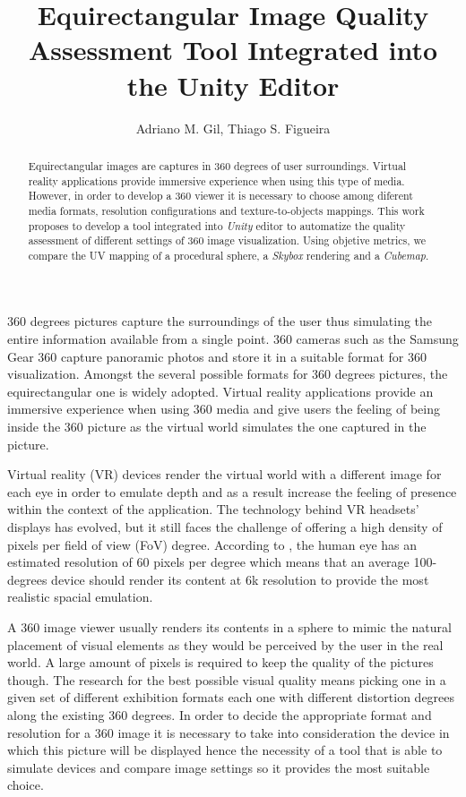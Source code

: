 \documentclass[12pt]{article}
\title{Equirectangular Image Quality Assessment Tool Integrated into the Unity Editor}
\author{Adriano M. Gil\inst{1}, Thiago S. Figueira\inst{1}}
\begin{document}
\maketitle

\begin{abstract}
    Equirectangular images are captures in 360 degrees of user surroundings. Virtual reality applications provide immersive experience when using this type of media. However, in order to develop a 360 viewer it is necessary to choose among diferent media formats, resolution configurations and texture-to-objects mappings. This work proposes to develop a tool integrated into \textit{Unity} editor to automatize the quality assessment of different settings of 360 image visualization. Using objetive metrics, we compare the UV mapping of a procedural sphere, a \textit{Skybox} rendering and a \textit{Cubemap}.
\end{abstract}

360 degrees pictures capture the surroundings of the user thus simulating the entire information available from a single point. 360 cameras such as the Samsung Gear 360 capture panoramic photos and store it in a suitable format for 360 visualization. Amongst the several possible formats for 360 degrees pictures, the equirectangular one is widely adopted. Virtual reality applications provide an immersive experience when using 360 media and give users the feeling of being inside the 360 picture as the virtual world simulates the one captured in the picture.

Virtual reality (VR) devices render the virtual world with a different image for each eye in order to emulate depth and as a result increase the feeling of presence within the context of the application. The technology behind VR headsets' displays has evolved, but it still faces the challenge of offering a high density of pixels per field of view (FoV) degree. According to \cite{va1965visual}, the human eye has an estimated resolution of 60 pixels per degree which means that an average 100-degrees device should render its content at 6k resolution to provide the most realistic spacial emulation.

A 360 image viewer usually renders its contents in a sphere to mimic the natural placement of visual elements as they would be perceived by the user in the real world. A large amount of pixels is required to keep the quality of the pictures though. The research for the best possible visual quality means picking one in a given set of different exhibition formats each one with different distortion degrees along the existing 360 degrees. In order to decide the appropriate format and resolution for a 360 image it is necessary to take into consideration the device in which this picture will be displayed hence the necessity of a tool that is able to simulate devices and compare image settings so it provides the most suitable choice.
\end{document}
